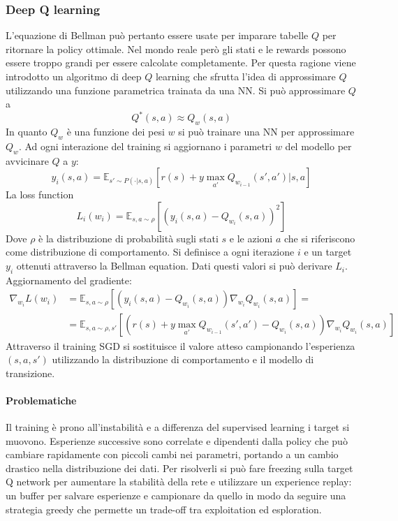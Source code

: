\subsubsection{Deep Q learning}
L'equazione di Bellman pu\`o pertanto essere usate per imparare tabelle $Q$ per ritornare la policy ottimale.
Nel mondo reale per\`o gli stati e le rewards possono essere troppo grandi per essere calcolate completamente.
Per questa ragione viene introdotto un algoritmo di deep $Q$ learning che sfrutta l'idea di approssimare $Q$ utilizzando una funzione parametrica trainata da una NN.
Si pu\`o approssimare $Q$ a
$$Q^*(s,a) \approx Q_w(s,a)$$
In quanto $Q_w$ \`e una funzione dei pesi $w$ si pu\`o trainare una NN per approssimare $Q_w$.
Ad ogni interazione del training si aggiornano i parametri $w$ del modello per avvicinare $Q$ a $y$:
$$y_i(s,a) = \mathbb{E}_{s'\sim P(\cdot|s,a)}[r(s)+y\max_{a'}Q_{w_{i-1}}(s',a')|s,a]$$
La loss function
$$L_i(w_i) = \mathbb{E}_{s,a\sim \rho}[(y_i(s,a) - Q_{w_i}(s,a))^2]$$
Dove $\rho$ \`e la distribuzione di probabilit\`a sugli stati $s$ e le azioni $a$ che si riferiscono come distribuzione di comportamento.
Si definisce a ogni iterazione $i$ e un target $y_i$ ottenuti attraverso la Bellman equation.
Dati questi valori si pu\`o derivare $L_i$.
Aggiornamento del gradiente:
\begin{align*}
	\nabla_{w_i}L(w_i) &= \mathbb{E}_{s,a\sim\rho}[(y_i(s,a) - Q_{w_i}(s,a))\nabla_{w_i}Q_{w_i}(s,a)]=\\
	&= \mathbb{E}_{s,a\sim\rho,s'}[(r(s) + y\max_{a'}Q_{w_{i-1}}(s',a')-Q_{w_i}(s,a))\nabla_{w_i}Q_{w_i}(s,a)]
\end{align*}
Attraverso il training SGD si sostituisce il valore atteso campionando l'esperienza $(s,a,s')$ utilizzando la distribuzione di comportamento e il modello di transizione.

\paragraph{Problematiche}
Il training \`e prono all'instabilit\`a e a differenza del supervised learning i target si muovono.
Esperienze successive sono correlate e dipendenti dalla policy che pu\`o cambiare rapidamente con piccoli cambi nei parametri, portando a un cambio drastico nella distribuzione dei dati.
Per risolverli si pu\`o fare freezing sulla target Q network per aumentare la stabilit\`a della rete e utilizzare un experience replay: un buffer per salvare esperienze e campionare da quello in modo da seguire una strategia greedy che permette un trade-off tra exploitation ed esploration.

